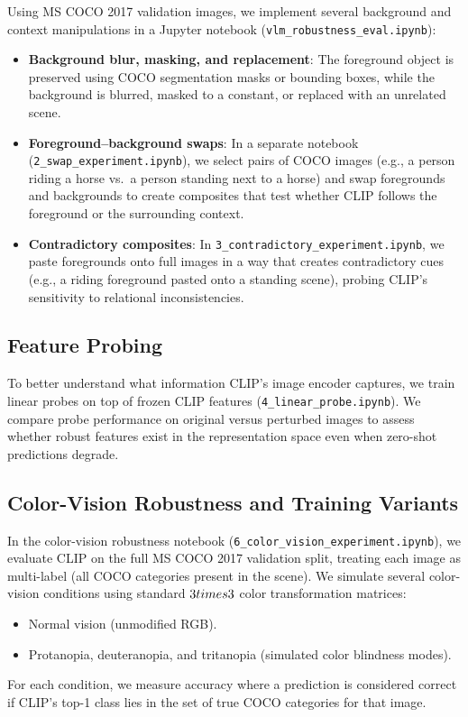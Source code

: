 \documentclass[11pt]{article}
\begin{document}
Using MS COCO 2017 validation images, we implement several background and context manipulations in a Jupyter notebook (\texttt{vlm\_robustness\_eval.ipynb}):
\begin{itemize}
    \item \textbf{Background blur, masking, and replacement}: The foreground object is preserved using COCO segmentation masks or bounding boxes, while the background is blurred, masked to a constant, or replaced with an unrelated scene.
    \item \textbf{Foreground--background swaps}: In a separate notebook (\texttt{2\_swap\_experiment.ipynb}), we select pairs of COCO images (e.g., a person riding a horse vs.\ a person standing next to a horse) and swap foregrounds and backgrounds to create composites that test whether CLIP follows the foreground or the surrounding context.
    \item \textbf{Contradictory composites}: In \texttt{3\_contradictory\_experiment.ipynb}, we paste foregrounds onto full images in a way that creates contradictory cues (e.g., a riding foreground pasted onto a standing scene), probing CLIP's sensitivity to relational inconsistencies.
\end{itemize}

\subsection{Feature Probing}

To better understand what information CLIP's image encoder captures, we train linear probes on top of frozen CLIP features (\texttt{4\_linear\_probe.ipynb}). We compare probe performance on original versus perturbed images to assess whether robust features exist in the representation space even when zero-shot predictions degrade.

\subsection{Color-Vision Robustness and Training Variants}

In the color-vision robustness notebook (\texttt{6\_color\_vision\_experiment.ipynb}), we evaluate CLIP on the full MS COCO 2017 validation split, treating each image as multi-label (all COCO categories present in the scene). We simulate several color-vision conditions using standard $3\\times3$ color transformation matrices:
\begin{itemize}
    \item Normal vision (unmodified RGB).
    \item Protanopia, deuteranopia, and tritanopia (simulated color blindness modes).
\end{itemize}
For each condition, we measure accuracy where a prediction is considered correct if CLIP's top-1 class lies in the set of true COCO categories for that image.
\end{document}
